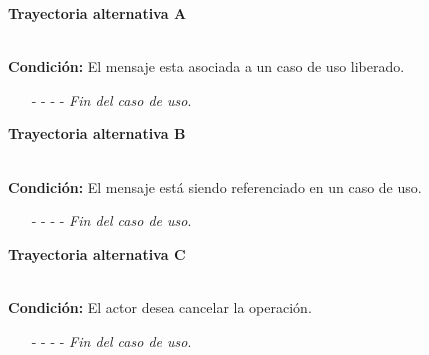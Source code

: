 \hypertarget{CU9-3:TAA}{\textbf{Trayectoria alternativa A}}\\
\noindent \textbf{Condición:} El mensaje esta asociada a un caso de uso liberado.
\begin{enumerate}
	\UCpaso[\UCsist] Oculta el botón \eliminar del mensaje que esta asociado a casos de uso liberados de la pantalla .
	\item[- -] - - {\em {Fin del caso de uso}}.%
\end{enumerate}
\hypertarget{CU9-3:TAB}{\textbf{Trayectoria alternativa B}}\\
\noindent \textbf{Condición:} El mensaje está siendo referenciado en un caso de uso.
\begin{enumerate}
	\UCpaso[\UCsist] Muestra el mensaje  en la pantalla  en una pantalla emergente con la lista de casos de uso que están referenciando al mensaje.
	\UCpaso[\UCactor] Oprime el botón  de la pantalla emergente.
	\UCpaso[\UCsist] Muestra la pantalla .
	\item[- -] - - {\em {Fin del caso de uso}}.%
\end{enumerate}
\hypertarget{CU9-3:TAC}{\textbf{Trayectoria alternativa C}}\\
\noindent \textbf{Condición:} El actor desea cancelar la operación.
\begin{enumerate}
	\UCpaso[\UCactor] Oprime el botón  de la pantalla emergente.
	\UCpaso[\UCsist] Muestra la pantalla .
	\item[- -] - - {\em {Fin del caso de uso}}.%
\end{enumerate}	

